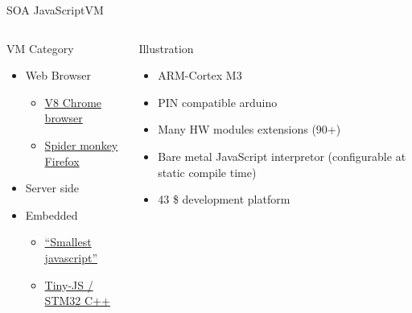 %
\begin{Frame}{SOA JavaScriptVM}
  \begin{columns}[t]
    \begin{column}{\BW} %
      \begin{block}{VM Category}
        \begin{itemize}
        \item Web Browser
          \begin{itemize}
          \item
            \href{https://en.wikipedia.org/wiki/V8_(JavaScript_engine)}{V8
              Chrome browser}
          \item
            \href{https://en.wikipedia.org/wiki/SpiderMonkey_(JavaScript_engine)}{Spider
              monkey Firefox}
          \end{itemize}
        \item Server side
        \item Embedded
          \begin{itemize}
          \item \href{https://github.com/cesanta/v7/}{``Smallest javascript''}
          \item \href{https://github.com/snoozbuster/tiny-js}{Tiny-JS
              / STM32 C++}
          \end{itemize}
        \end{itemize}
      \end{block} 
    \end{column}
    \begin{column}{\BW} %
      \begin{block}{Illustration}
        \begin{itemize}
        \item ARM-Cortex M3
        \item PIN compatible arduino
        \item Many HW modules extensions (90+)
        \item Bare metal JavaScript interpretor (configurable at
          static compile time)
        \item 43 \$ development platform
        \end{itemize}
      \end{block}   
    \end{column}
  \end{columns}  
\end{Frame}


